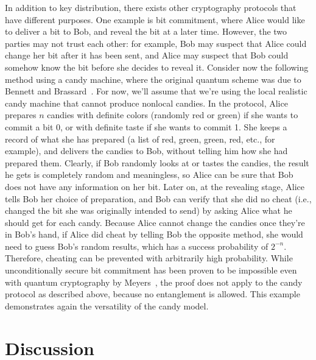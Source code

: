 \documentclass{article}
\begin{document}
In addition to key distribution, there exists other cryptography protocols that have different purposes.
One example is bit commitment, where Alice would like to deliver a bit to Bob, and reveal the bit at a later time.
However, the two parties may not trust each other: for example, Bob may suspect that Alice could change her bit after it has been sent, and Alice may suspect that Bob could somehow know the bit before she decides to reveal it.
Consider now the following method using a candy machine, where the original quantum scheme was due to Bennett and Brassard~\cite{bennett1984quantum}. 
For now, we'll assume that we're using the local realistic candy machine that cannot produce nonlocal candies.
In the protocol, Alice prepares $n$ candies with definite colors (randomly red or green) if she wants to commit a bit 0, or with definite taste if she wants to commit 1.
She keeps a record of what she has prepared (a list of red, green, green, red, etc., for example), and delivers the candies to Bob, without telling him how she had prepared them.
Clearly, if Bob randomly looks at or tastes the candies, the result he gets is completely random and meaningless, so Alice can be sure that Bob does not have any information on her bit.
Later on, at the revealing stage, Alice tells Bob her choice of preparation, and Bob can verify that she did no cheat (i.e., changed the bit she was originally intended to send) by asking Alice what he should get for each candy.
Because Alice cannot change the candies once they're in Bob's hand, if Alice did cheat by telling Bob the opposite method, she would need to guess Bob's random results, which has a success probability of $2^{-n}$.
Therefore, cheating can be prevented with arbitrarily high probability.
While unconditionally secure bit commitment has been proven to be impossible even with quantum cryptography by Meyers~\cite{mayers1997unconditionally}, the proof does not apply to the candy protocol as described above, because no entanglement is allowed.
This example demonstrates again the versatility of the candy model.

\section{Discussion}
\end{document}
